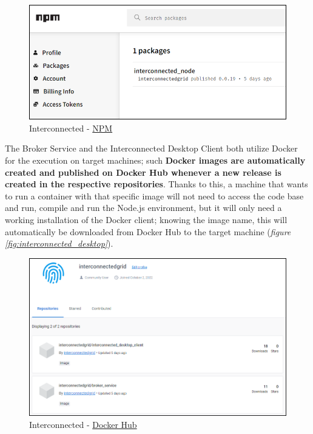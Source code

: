 \begin{figure}[!ht]
    \centering
    \includegraphics[scale=0.45]{document/chapters/chapter_7/images/interconnected_npm.png}
    \caption{Interconnected - \href{https://www.npmjs.com/package/interconnected_node}{NPM}}
    \label{fig:interconnected_npm}
\end{figure}

The Broker Service and the Interconnected Desktop Client both utilize Docker for the execution on target machines; such \textbf{Docker images are automatically created and published on Docker Hub whenever a new release is created in the respective repositories}. Thanks to this, a machine that wants to run a container with that specific image will not need to access the code base and run, compile and run the Node.js environment, but it will only need a working installation of the Docker client; knowing the image name, this will automatically be downloaded from Docker Hub to the target machine (\textit{figure \ref{fig:interconnected_desktop}}). 

\begin{figure}[!ht]
    \centering
    \includegraphics[width=\linewidth]{document/chapters/chapter_7/images/interconnected_dockerhub.png}
    \caption{Interconnected - \href{https://hub.docker.com/u/interconnectedgrid}{Docker Hub}}
    \label{fig:interconnected_dockerhub}
\end{figure}

